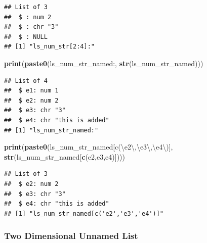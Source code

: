 \documentclass[
]{book}
\newenvironment{Shaded}{\begin{snugshade}}{\end{snugshade}}
\newcommand{\CharTok}[1]{\textcolor[rgb]{0.31,0.60,0.02}{#1}}
\newcommand{\KeywordTok}[1]{\textcolor[rgb]{0.13,0.29,0.53}{\textbf{#1}}}
\newcommand{\NormalTok}[1]{#1}
\newcommand{\StringTok}[1]{\textcolor[rgb]{0.31,0.60,0.02}{#1}}
\begin{document}
\begin{verbatim}
## List of 3
##  $ : num 2
##  $ : chr "3"
##  $ : NULL
## [1] "ls_num_str[2:4]:"
\end{verbatim}

\begin{Shaded}
\begin{Highlighting}[]
\KeywordTok{print}\NormalTok{(}\KeywordTok{paste0}\NormalTok{(}\StringTok{\textquotesingle{}ls\_num\_str\_named:\textquotesingle{}}\NormalTok{, }\KeywordTok{str}\NormalTok{(ls\_num\_str\_named)))}
\end{Highlighting}
\end{Shaded}

\begin{verbatim}
## List of 4
##  $ e1: num 1
##  $ e2: num 2
##  $ e3: chr "3"
##  $ e4: chr "this is added"
## [1] "ls_num_str_named:"
\end{verbatim}

\begin{Shaded}
\begin{Highlighting}[]
\KeywordTok{print}\NormalTok{(}\KeywordTok{paste0}\NormalTok{(}\StringTok{\textquotesingle{}ls\_num\_str\_named[c(}\CharTok{\textbackslash{}\textquotesingle{}}\StringTok{e2}\CharTok{\textbackslash{}\textquotesingle{}}\StringTok{,}\CharTok{\textbackslash{}\textquotesingle{}}\StringTok{e3}\CharTok{\textbackslash{}\textquotesingle{}}\StringTok{,}\CharTok{\textbackslash{}\textquotesingle{}}\StringTok{e4}\CharTok{\textbackslash{}\textquotesingle{}}\StringTok{)]\textquotesingle{}}\NormalTok{, }\KeywordTok{str}\NormalTok{(ls\_num\_str\_named[}\KeywordTok{c}\NormalTok{(}\StringTok{\textquotesingle{}e2\textquotesingle{}}\NormalTok{,}\StringTok{\textquotesingle{}e3\textquotesingle{}}\NormalTok{,}\StringTok{\textquotesingle{}e4\textquotesingle{}}\NormalTok{)])))}
\end{Highlighting}
\end{Shaded}

\begin{verbatim}
## List of 3
##  $ e2: num 2
##  $ e3: chr "3"
##  $ e4: chr "this is added"
## [1] "ls_num_str_named[c('e2','e3','e4')]"
\end{verbatim}

\hypertarget{two-dimensional-unnamed-list}{%
\subsubsection{Two Dimensional Unnamed List}\label{two-dimensional-unnamed-list}}
\end{document}
